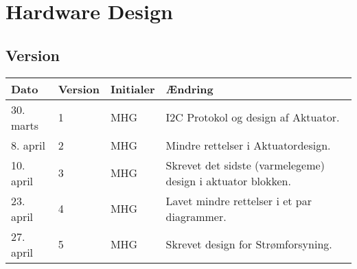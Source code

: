 
\chapter{Hardware Design} \label{ch:HwDesign}

\section{Version}
\begin{table}[h]
	\centering
	\begin{tabularx}{\textwidth - 2cm}{|l|l|l|X|}
	\hline
	Dato	& Version	& Initialer & Ændring	\\ \hline
	30. marts & 1 & MHG & I2C Protokol og design af Aktuator. \\ \hline
	8. april & 2 & MHG & Mindre rettelser i Aktuatordesign. \\ \hline
	10. april & 3 & MHG & Skrevet det sidste (varmelegeme) design i aktuator blokken. \\\hline 
	23. april & 4 & MHG & Lavet mindre rettelser i et par diagrammer. \\\hline
	27. april & 5 & MHG & Skrevet design for Strømforsyning. \\\hline
	\end{tabularx}
\end{table}



	
